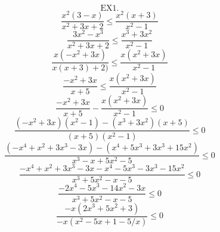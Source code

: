 \documentclass{article}
\begin{document}
\[ \text{EX1.} \]
\[ \frac{x^2(3-x)}{x^2+3x+2} \le \frac{x^2(x+3)}{x^2-1} \]
\[ \frac{3x^2-x^3}{x^2+3x+2} \le \frac{x^3+3x^2}{x^2-1} \]
\[ \frac{x(-x^2+3x)}{x(x+3)+2)} \le \frac{x(x^2+3x)}{x^2-1} \]
\[ \frac{-x^2+3x}{x+5} \le \frac{x(x^2+3x)}{x^2-1} \]
\[ \frac{-x^2+3x}{x+5} - \frac{x(x^2+3x)}{x^2-1} \le 0 \]
\[ \frac{(-x^2+3x)(x^2-1) - (x^3+3x^2)(x+5)}{(x+5)(x^2-1)} \le 0 \]
\[ \frac{(-x^4+x^2+3x^3-3x) - (x^4+5x^3+3x^3+15x^2)}{x^3-x+5x^2-5} \le 0 \]
\[ \frac{-x^4+x^2+3x^3-3x-x^4-5x^3-3x^3-15x^2}{x^3+5x^2-x-5} \le 0 \]
\[ \frac{-2x^4-5x^3-14x^2-3x}{x^3+5x^2-x-5} \le 0 \]
\[ \frac{-x(2x^3+5x^2+3)}{-x(x^2-5x+1-5/x)} \le 0 \]
\end{document}
